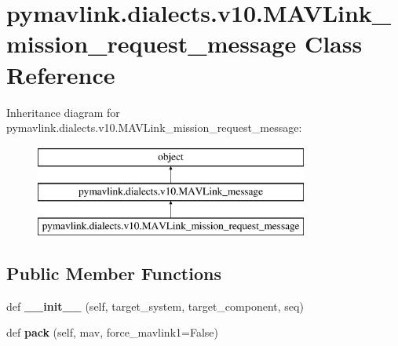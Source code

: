 \hypertarget{classpymavlink_1_1dialects_1_1v10_1_1MAVLink__mission__request__message}{}\section{pymavlink.\+dialects.\+v10.\+M\+A\+V\+Link\+\_\+mission\+\_\+request\+\_\+message Class Reference}
\label{classpymavlink_1_1dialects_1_1v10_1_1MAVLink__mission__request__message}
Inheritance diagram for pymavlink.\+dialects.\+v10.\+M\+A\+V\+Link\+\_\+mission\+\_\+request\+\_\+message\+:\begin{figure}[H]
\begin{center}
\leavevmode
\includegraphics[height=3.000000cm]{classpymavlink_1_1dialects_1_1v10_1_1MAVLink__mission__request__message}
\end{center}
\end{figure}
\subsection*{Public Member Functions}
\begin{DoxyCompactItemize}
\item 
\mbox{\label{classpymavlink_1_1dialects_1_1v10_1_1MAVLink__mission__request__message_ad35a9049326037e42f411edddf6c0a3f}} 
def {\bfseries \+\_\+\+\_\+init\+\_\+\+\_\+} (self, target\+\_\+system, target\+\_\+component, seq)
\item 
\mbox{\label{classpymavlink_1_1dialects_1_1v10_1_1MAVLink__mission__request__message_addca2882a8fa137009d93be0193ddd2b}} 
def {\bfseries pack} (self, mav, force\+\_\+mavlink1=False)
\end{DoxyCompactItemize}
